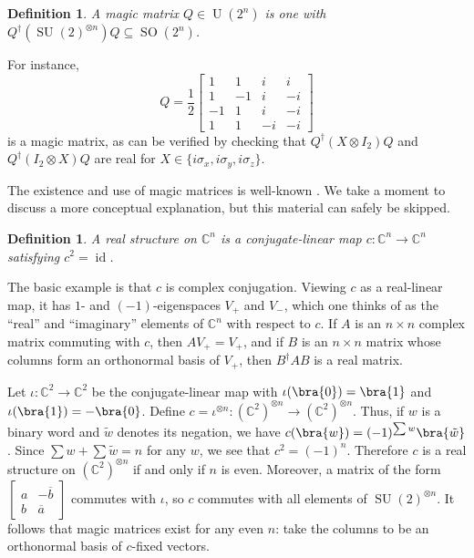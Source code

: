 \documentclass[reqno]{amsart}
\newtheorem{definition}[theorem]{Definition}
\theoremstyle{definition} \newtheorem{example}[theorem]{Example}
\newcommand{\CC}{\mathbb{C}}
\newcommand{\U}{\operatorname{U}}
\newcommand{\SU}{\operatorname{SU}}
\newcommand{\SO}{\operatorname{SO}}
\DeclareMathOperator{\id}{id}
\begin{document}
\begin{definition}
A \emph{magic matrix} $Q \in \U(2^n)$ is one with $Q^\dagger (\SU(2)^{\otimes n}) Q \subseteq \SO(2^n)$.
\end{definition}
For instance,
\begin{equation*}
Q = \frac{1}{2}\begin{bmatrix}
1 & 1 & i & i\\
1 & -1 & i & -i\\
-1 & 1 & i & -i\\
1 & 1 & -i & -i
\end{bmatrix}
\end{equation*}
is a magic matrix, as can be verified by checking that $Q^\dagger (X \otimes I_2) Q$ and $Q^\dagger (I_2 \otimes X) Q$ are real for $X \in \{i\sigma_x, i\sigma_y, i\sigma_z\}$.

The existence and use of magic matrices is well-known \cite{CCD, hill-wootters, makhlin}.
We take a moment to discuss a more conceptual explanation, but this material can safely be skipped.
\begin{definition}
A \emph{real structure} on $\CC^n$ is a conjugate-linear map $c : \CC^n \to \CC^n$ satisfying $c^2 = \id$.
\end{definition}
The basic example is that $c$ is complex conjugation. Viewing $c$ as a real-linear map, it has $1$- and $(-1)$-eigenspaces $V_+$ and $V_-$, which one thinks of as the ``real'' and ``imaginary'' elements of $\CC^n$ with respect to $c$. If $A$ is an $n \times n$ complex matrix commuting with $c$, then $AV_+ = V_+$, and if $B$ is an $n \times n$ matrix whose columns form an orthonormal basis of $V_+$, then $B^\dagger AB$ is a real matrix.

Let $\iota : \CC^2 \to \CC^2$ be the conjugate-linear map with $\iota(\bra{0}) = \bra{1}$ and $\iota(\bra{1}) = -\bra{0}$. Define $c = \iota^{\otimes n} : (\CC^2)^{\otimes n} \to (\CC^2)^{\otimes n}$. Thus, if $w$ is a binary word and $\tilde{w}$ denotes its negation, we have $c(\bra{w}) = (-1)^{\sum w} \bra{\tilde{w}}$. Since $\sum w + \sum \tilde{w} = n$ for any $w$, we see that $c^2 = (-1)^n$. Therefore $c$ is a real structure on $(\CC^2)^{\otimes n}$ if and only if $n$ is even. Moreover, a matrix of the form $\left[\begin{smallmatrix} a & -\overline{b}\\ b & \overline{a}\end{smallmatrix}\right]$ commutes with $\iota$, so $c$ commutes with all elements of $\SU(2)^{\otimes n}$. It follows that magic matrices exist for any even $n$: take the columns to be an orthonormal basis of $c$-fixed vectors.
\end{document}
